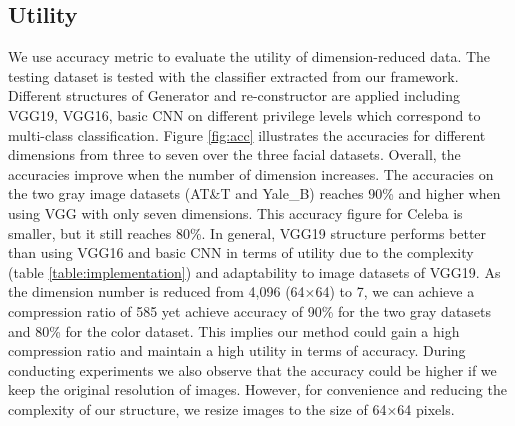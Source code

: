 \subsection{Utility}
We use accuracy metric to evaluate the utility of dimension-reduced data. The testing dataset is tested with the classifier extracted from our framework. Different structures of Generator and re-constructor are applied including VGG19, VGG16, basic CNN on different privilege levels which correspond to multi-class classification. Figure \ref{fig:acc} illustrates the accuracies for different dimensions from three to seven over the three facial datasets. Overall, the accuracies improve when the number of dimension increases. The accuracies on the two gray image datasets (AT\&T and Yale\_B) reaches 90\% and higher when using VGG with only seven dimensions. This accuracy figure for Celeba is smaller, but it still reaches 80\%. In general, VGG19 structure performs better than using VGG16 and basic CNN in terms of utility due to the complexity (table \ref{table:implementation}) and adaptability to image datasets of VGG19. As the dimension number is reduced from 4,096 (64$\times$64) to 7, we can achieve a compression ratio of 585 yet achieve accuracy of 90\% for the two gray datasets and 80\% for the color dataset. This implies our method could gain a high compression ratio and maintain a high utility in terms of accuracy. During conducting experiments we also observe that the accuracy could be higher if we keep the original resolution of images. However, for convenience and reducing the complexity of our structure, we resize images to the size of 64$\times$64 pixels.    

